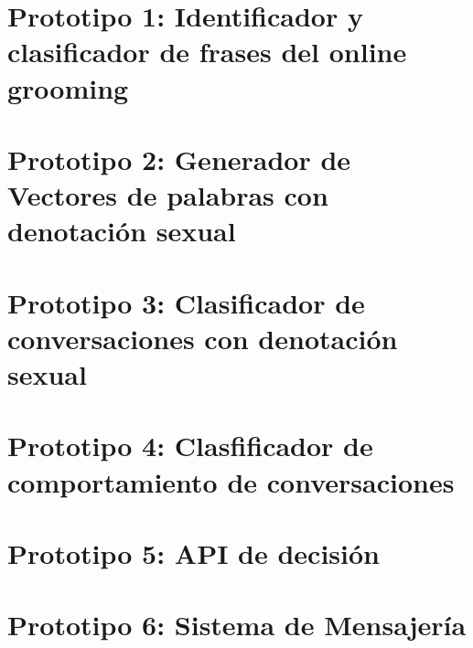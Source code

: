 \documentclass[oneside,10pt]{book}
\begin{document}
%	
%
%
%
%
%
%
%
%


\chapter{Prototipo 1: Identificador y clasificador de frases del online grooming}


\chapter{Prototipo 2:  Generador de Vectores de palabras con denotaci\'on sexual}




\chapter{Prototipo 3: Clasificador de conversaciones con denotaci\'on sexual}


\chapter{Prototipo 4: Clasfificador de comportamiento de conversaciones}



\chapter{Prototipo 5: API de decisi\'on}


\chapter{Prototipo 6: Sistema de Mensajer\'ia}








\end{document}

